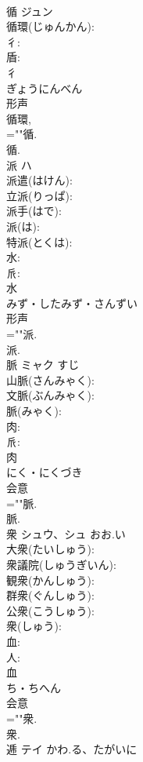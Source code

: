\documentclass[8pt]{extreport}
\begin{document}
\begin{CJK}{UTF8}{min}
\\	循	ジュン			
\\	循環(じゅんかん): 
\\	彳: 
\\	盾: 
\\	彳	
\\	ぎょうにんべん	
\\	形声 
\\	循環, 
\\	=""循.
\\	循.
\\	派	ハ			
\\	派遣(はけん): 
\\	立派(りっぱ): 
\\	派手(はで): 
\\	派(は): 
\\	特派(とくは): 
\\	水: 
\\	𠂢: 
\\	水	
\\	みず・したみず・さんずい	
\\	形声 
\\	=""派.
\\	派.
\\	脈	ミャク	すじ		
\\	山脈(さんみゃく): 
\\	文脈(ぶんみゃく): 
\\	脈(みゃく): 
\\	肉: 
\\	𠂢: 
\\	肉	
\\	にく・にくづき	
\\	会意 
\\	=""脈.
\\	脈.
\\	衆	シュウ、シュ	おお.い		
\\	大衆(たいしゅう): 
\\	衆議院(しゅうぎいん): 
\\	観衆(かんしゅう): 
\\	群衆(ぐんしゅう): 
\\	公衆(こうしゅう): 
\\	衆(しゅう): 
\\	血: 
\\	人: 
\\	血	
\\	ち・ちへん	
\\	会意 
\\	=""衆.
\\	衆.
\\	逓	テイ	かわ.る、たがいに		

\end{CJK}
\end{document}
